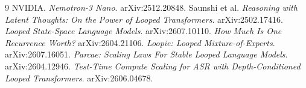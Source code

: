 \documentclass[11pt,a4paper]{article}
\begin{document}
\begin{thebibliography}{9}
 NVIDIA. \emph{Nemotron-3 Nano}. arXiv:2512.20848.
 Saunshi et al. \emph{Reasoning with Latent Thoughts: On the Power of Looped
  Transformers}. arXiv:2502.17416.
 \emph{Looped State-Space Language Models}. arXiv:2607.10110.
 \emph{How Much Is One Recurrence Worth?} arXiv:2604.21106.
 \emph{Loopie: Looped Mixture-of-Experts}. arXiv:2607.16051.
 \emph{Parcae: Scaling Laws For Stable Looped Language Models}. arXiv:2604.12946.
 \emph{Test-Time Compute Scaling for ASR with Depth-Conditioned Looped
  Transformers}. arXiv:2606.04678.
\end{thebibliography}
\end{document}
